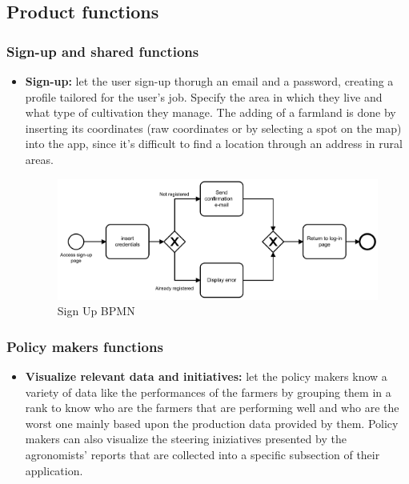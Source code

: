 \documentclass[table, 12pt]{article}
\begin{document}
\subsection{Product functions}
\label{product_functions}
\subsubsection{Sign-up and shared functions}
\begin{itemize}
    \item \textbf{Sign-up:} let the user sign-up thorugh an email and a password, creating a profile tailored for the user's job. Specify the area in which they live and what type of cultivation they manage\footnotemark. The adding of a farmland is done by inserting its coordinates (raw coordinates or by selecting a spot on the map) into the app, since it's difficult to find a location through an address in rural areas.
    \begin{center}
        \begin{figure}[!h]
            \includegraphics[width=\textwidth]{assets/BPMN/SignUpBpmn}
            \caption{Sign Up BPMN}
            \label{fig: singup}
        \end{figure}
    \end{center}
\end{itemize}
\subsubsection{Policy makers functions}
\begin{itemize}                                 
    \item \textbf{Visualize relevant data and initiatives:} let the policy makers know a variety of data like the performances of the farmers by grouping them in a rank to know who are the farmers that are performing well and who are the worst one mainly based upon the production data provided by them\footnotemark.
    Policy makers can also visualize the steering iniziatives presented by the agronomists' reports that are collected into a specific subsection of their application.
\end{itemize}
\end{document}
